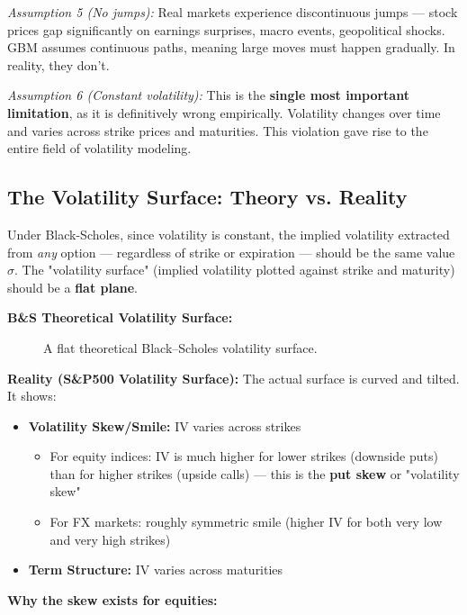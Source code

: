 \documentclass[12pt,openany]{book}
\theoremstyle{definition}
\theoremstyle{remark}
\begin{document}
\emph{Assumption 5 (No jumps):} Real markets experience discontinuous jumps --- stock prices gap significantly on earnings surprises, macro events, geopolitical shocks. GBM assumes continuous paths, meaning large moves must happen gradually. In reality, they don't.

\emph{Assumption 6 (Constant volatility):} This is the \textbf{single most important limitation}, as it is definitively wrong empirically. Volatility changes over time and varies across strike prices and maturities. This violation gave rise to the entire field of volatility modeling.

\medskip
\subsection{The Volatility Surface: Theory vs. Reality}
Under Black-Scholes, since volatility is constant, the implied volatility extracted from \emph{any} option --- regardless of strike or expiration --- should be the same value \(\sigma\). The "volatility surface" (implied volatility plotted against strike and maturity) should be a \textbf{flat plane}.

\textbf{B\&S Theoretical Volatility Surface:}

\begin{figure}[H]
\centering
{}
\caption{A flat theoretical Black--Scholes volatility surface.}
\end{figure}
\textbf{Reality (S\&P500 Volatility Surface):} The actual surface is curved and tilted. It shows:

\begin{itemize}
\item \textbf{Volatility Skew/Smile:} IV varies across strikes

\begin{itemize}
\item For equity indices: IV is much higher for lower strikes (downside puts) than for higher strikes (upside calls) --- this is the \textbf{put skew} or "volatility skew"


\item For FX markets: roughly symmetric smile (higher IV for both very low and very high strikes)


\end{itemize}

\item \textbf{Term Structure:} IV varies across maturities


\end{itemize}
\textbf{Why the skew exists for equities:}
\end{document}
